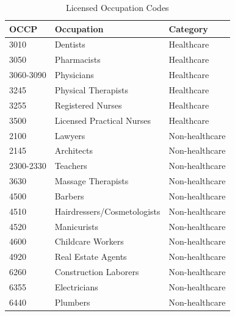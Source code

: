 \documentclass[12pt]{article}
\begin{document}
\begin{table}[H]
\centering
\caption{Licensed Occupation Codes}
\begin{tabular}{lll}
\toprule
OCCP & Occupation & Category \\
\midrule
3010 & Dentists & Healthcare \\
3050 & Pharmacists & Healthcare \\
3060-3090 & Physicians & Healthcare \\
3245 & Physical Therapists & Healthcare \\
3255 & Registered Nurses & Healthcare \\
3500 & Licensed Practical Nurses & Healthcare \\
\midrule
2100 & Lawyers & Non-healthcare \\
2145 & Architects & Non-healthcare \\
2300-2330 & Teachers & Non-healthcare \\
3630 & Massage Therapists & Non-healthcare \\
4500 & Barbers & Non-healthcare \\
4510 & Hairdressers/Cosmetologists & Non-healthcare \\
4520 & Manicurists & Non-healthcare \\
4600 & Childcare Workers & Non-healthcare \\
4920 & Real Estate Agents & Non-healthcare \\
6260 & Construction Laborers & Non-healthcare \\
6355 & Electricians & Non-healthcare \\
6440 & Plumbers & Non-healthcare \\
\bottomrule
\end{tabular}
\label{tab:occp}
\end{table}
\end{document}
